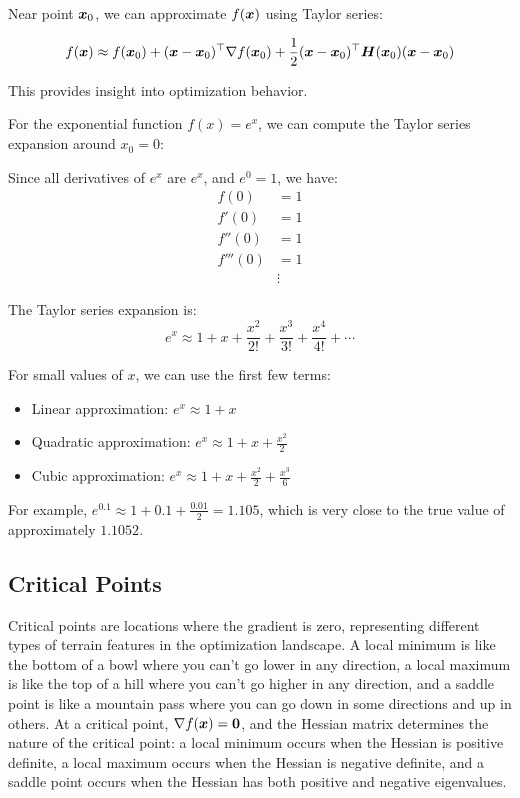 Near point $\boldsymbol{x}_0$, we can approximate $f(\boldsymbol{x})$ using Taylor series:

\begin{equation}
f(\boldsymbol{x}) \approx f(\boldsymbol{x}_0) + (\boldsymbol{x} - \boldsymbol{x}_0)^\top \nabla f(\boldsymbol{x}_0) + \frac{1}{2}(\boldsymbol{x} - \boldsymbol{x}_0)^\top \boldsymbol{H}(\boldsymbol{x}_0) (\boldsymbol{x} - \boldsymbol{x}_0)
\end{equation}

This provides insight into optimization behavior.

\begin{example}[Taylor Series for $f(x) = e^x$ around $x_0 = 0$]
For the exponential function $f(x) = e^x$, we can compute the Taylor series expansion around $x_0 = 0$:

Since all derivatives of $e^x$ are $e^x$, and $e^0 = 1$, we have:
\begin{align}
f(0) &= 1 \\
f'(0) &= 1 \\
f''(0) &= 1 \\
f'''(0) &= 1 \\
&\vdots
\end{align}

The Taylor series expansion is:
\begin{equation}
e^x \approx 1 + x + \frac{x^2}{2!} + \frac{x^3}{3!} + \frac{x^4}{4!} + \cdots
\end{equation}

For small values of $x$, we can use the first few terms:
\begin{itemize}
    \item Linear approximation: $e^x \approx 1 + x$
    \item Quadratic approximation: $e^x \approx 1 + x + \frac{x^2}{2}$
    \item Cubic approximation: $e^x \approx 1 + x + \frac{x^2}{2} + \frac{x^3}{6}$
\end{itemize}

For example, $e^{0.1} \approx 1 + 0.1 + \frac{0.01}{2} = 1.105$, which is very close to the true value of approximately $1.1052$.
\end{example}

\subsection{Critical Points}

Critical points are locations where the gradient is zero, representing different types of terrain features in the optimization landscape. A local minimum is like the bottom of a bowl where you can't go lower in any direction, a local maximum is like the top of a hill where you can't go higher in any direction, and a saddle point is like a mountain pass where you can go down in some directions and up in others. At a critical point, $\nabla f(\boldsymbol{x}) = \boldsymbol{0}$, and the Hessian matrix determines the nature of the critical point: a local minimum occurs when the Hessian is positive definite, a local maximum occurs when the Hessian is negative definite, and a saddle point occurs when the Hessian has both positive and negative eigenvalues.

